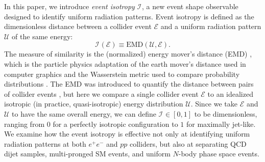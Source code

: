 \documentclass[letterpaper,11pt]{article}
\newcommand{\iso}[2]{\mathcal{I}^\text{#1}_{#2}}
\begin{document}
In this paper, we introduce \emph{event isotropy} $\iso{}{}$, a new event shape observable designed to identify uniform radiation patterns.
%
Event isotropy is defined as the dimensionless distance between a collider event $\mathcal{E}$ and a uniform radiation pattern $\mathcal{U}$ of the same energy: 
%
\begin{equation}
\iso{}{} \left( \mathcal{E} \right) \equiv \text{EMD} \left(\mathcal{U}, \mathcal{E}\right).
\label{eq:evIsoDef}
\end{equation}
%
The measure of similarity is the (normalized) energy mover's distance (EMD) \cite{Komiske:2019fks,Komiske:2019jim,Komiske:2020qhg}, which is the particle physics adaptation of the earth mover's distance used in computer graphics \cite{Peleg1989AUA, Rubner:1998:MDA:938978.939133,Rubner2000,Pele2008ALT,Pele2013TheTE} and the Wasserstein metric used to compare probability distributions \cite{wasserstein1969markov}.
%
The EMD was introduced to quantify the distance between pairs of collider events \cite{Komiske:2019fks,Komiske:2019jim,Komiske:2020qhg}, but here we compare a single collider event $\mathcal{E}$ to an idealized isotropic (in practice, quasi-isotropic) energy distribution $\mathcal{U}$.
%
Since we take $\mathcal{E}$ and $\mathcal{U}$ to have the same overall energy, we can define $\iso{}{} \in [0,1]$ to be dimensionless, ranging from $0$ for a perfectly isotropic configuration to $1$ for maximally jet-like. 
%
We examine how the event isotropy is effective not only at identifying uniform radiation patterns at both $e^+e^-$ and $pp$ colliders, but also at separating QCD dijet samples, multi-pronged SM events, and uniform $N$-body phase space events. 
\end{document}

